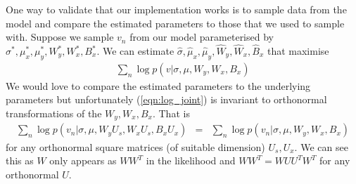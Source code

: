 \documentclass{article}
\begin{document}
One way to validate that our implementation works is to sample data from the model and compare the estimated
parameters to those that we used to sample with. Suppose we sample $v_n$ from our model parameterised by
$\sigma^*, \mu^*_x, \mu^*_y, W^*_y, W^*_x, B^*_x$.
We can estimate $\hat{\sigma}, \hat{\mu}_x, \hat{\mu}_y, \hat{W}_y, \hat{W}_x, \hat{B}_x$ that maximise
\begin{eqnarray}
  \label{eqn:log_joint}
  \sum_n \log p(v|\sigma, \mu, W_y, W_x, B_x)
\end{eqnarray}
We would love to compare the estimated parameters to the underlying parameters but unfortunately (\ref{eqn:log_joint})
is invariant to orthonormal transformations of the $W_y, W_x, B_x$. That is
\begin{eqnarray}
  \sum_n \log p(v_n|\sigma, \mu, W_y U_s, W_x U_s, B_x U_x)
  &=&
  \sum_n \log p(v_n|\sigma, \mu, W_y, W_x, B_x)
\end{eqnarray}
for any orthonormal square matrices (of suitable dimension) $U_s, U_x$. We can see this as $W$ only appears
as $W W^T$ in the likelihood and $W W^T = W U U^T W^T$ for any orthonormal $U$.
\end{document}
